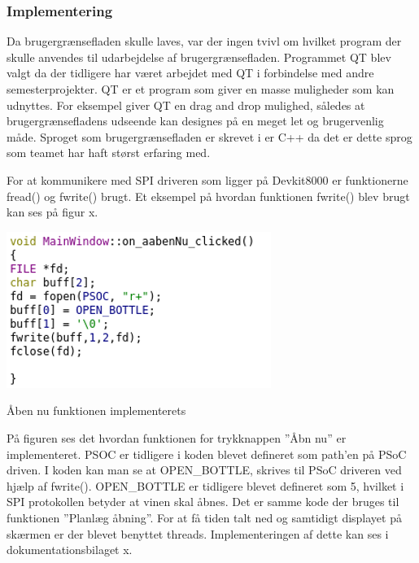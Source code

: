 \subsubsection{Implementering}

Da brugergrænsefladen skulle laves, var der ingen tvivl om hvilket program der skulle anvendes til udarbejdelse af brugergrænsefladen. Programmet QT blev valgt da der tidligere har været arbejdet med QT i forbindelse med andre semesterprojekter. QT er et program som giver en masse muligheder som kan udnyttes. For eksempel giver QT en drag and drop mulighed, således at brugergrænsefladens udseende kan designes på en meget let og brugervenlig måde.
Sproget som brugergrænsefladen er skrevet i er C++ da det er dette sprog som teamet har haft størst erfaring med.

For at kommunikere med SPI driveren som ligger på Devkit8000 er funktionerne fread() og fwrite() brugt. Et eksempel på hvordan funktionen fwrite() blev brugt kan ses på figur x.

\includegraphics{Billeder/kodeeksempel}
\caption{Åben nu funktionen implementerets}

På figuren ses det hvordan funktionen for trykknappen ”Åbn nu” er implementeret. PSOC er tidligere i koden blevet defineret som path’en på PSoC driven. I koden kan man se at OPEN_BOTTLE, skrives til PSoC driveren ved hjælp af fwrite(). OPEN_BOTTLE er tidligere blevet defineret som 5, hvilket i SPI protokollen betyder at vinen skal åbnes. Det er samme kode der bruges til funktionen ”Planlæg åbning”.
For at få tiden talt ned og samtidigt displayet på skærmen er der blevet benyttet threads. Implementeringen af dette kan ses i dokumentationsbilaget x.
